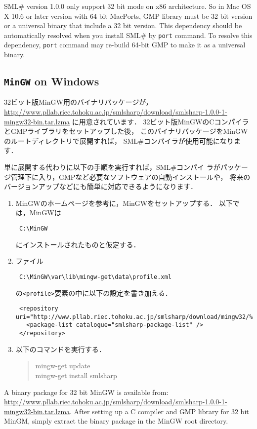 \documentclass{jbook}
\newcommand{\txt}[2]{#2}
\newcommand{\smlsharp}{SML\#}
\newcommand{\version}{1.0.0}
\newenvironment{program}{\begin{tt}\begin{quote}}{\end{quote}\end{tt}}
\begin{document}
	\smlsharp{} version \version{} only support 32 bit mode on x86
architecture.
	So in Mac OS X 10.6 or later version with 64 bit MacPorts,
GMP library must be 32 bit version or a universal binary that include a
32 bit version.
	This dependency should be automatically resolved when you
install \smlsharp{} by {\tt port} command.
	To resolve this dependency, {\tt port} command may re-build 64-bit GMP
to make it as a universal binary.
\fi%

\subsection{\txt{Windows上の{\tt MinGW}}{{\tt MinGW} on Windows}}

\ifx\jp%
	32ビット版MinGW用のバイナリパッケージが，
\url{http://www.pllab.riec.tohoku.ac.jp/smlsharp/download/smlsharp-1.0.0-1-mingw32-bin.tar.lzma}
に用意されています．
	32ビット版MinGWのCコンパイラとGMPライブラリをセットアップした後，
このバイナリパッケージをMinGWのルートディレクトリで展開すれば，
\smlsharp{}コンパイラが使用可能になります．

	単に展開する代わりに以下の手順を実行すれば，\smlsharp{}コンパイ
ラがパッケージ管理下に入り，GMPなど必要なソフトウェアの自動インストールや，
将来のバージョンアップなどにも簡単に対応できるようになります．
\begin{enumerate}
\item MinGWのホームページを参考に，MinGWをセットアップする．
以下では，MinGWは
\begin{verbatim}
 C:\MinGW
\end{verbatim}
にインストールされたものと仮定する．
\item 
ファイル
\begin{verbatim}
 C:\MinGW\var\lib\mingw-get\data\profile.xml
\end{verbatim}
の{\tt <profile>}要素の中に以下の設定を書き加える．
\begin{verbatim}
 <repository uri="http://www.pllab.riec.tohoku.ac.jp/smlsharp/download/mingw32/%F.xml.lzma">
   <package-list catalogue="smlsharp-package-list" />
 </repository>
\end{verbatim}
\item 以下のコマンドを実行する．
\begin{program}
mingw-get update\\
mingw-get install smlsharp
\end{program}
\end{enumerate} 
\else%
	A binary package for 32 bit MinGW is available from:
\url{http://www.pllab.riec.tohoku.ac.jp/smlsharp/download/smlsharp-1.0.0-1-mingw32-bin.tar.lzma}.
	After setting up a C compiler and GMP library for 32 bit MinGM,
simply extract the binary package in the MinGW root directory.
\end{document}
